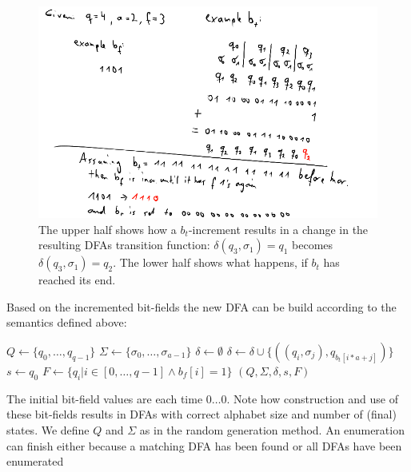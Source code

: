 
\begin{figure}
	\includegraphics[width=\linewidth]{images/dfa_enum_incr.png}
	\caption{The upper half shows how a $b_t$-increment results in a change in the resulting DFAs transition function: $\delta(q_3, \sigma_1) = q_1$ becomes $\delta(q_3, \sigma_1) = q_2$. The lower half shows what happens, if $b_t$ has reached its end.}
	\label{fig:dfa_enum_incr}
\end{figure}

Based on the incremented bit-fields the new DFA can be build according to the semantics defined above:
\vspace{0.2cm}
\begin{algorithmic}[1]
	\State $Q \gets \{q_0, \ldots, q_{q-1}\}$
	\State $\Sigma \gets \{\sigma_0, \ldots, \sigma_{a-1}\}$
	\State $\delta \gets \emptyset$
			\State $\delta \gets \delta \cup \{((q_i, \sigma_j), q_{b_t[i * a + j]})\}$
		\EndFor
	\EndFor
	\State $s \gets q_0$
	\State $F \gets \{ q_i | i \in [0, \ldots, q-1] \land b_f[i] = 1 \}$
	\State \Return $(Q, \Sigma, \delta, s, F)$
	\EndFunction
\end{algorithmic}
\vspace{0.2cm}
The initial bit-field values are each time $0\ldots 0$. Note how construction and use of these bit-fields results in DFAs with correct alphabet size and number of (final) states. We define $Q$ and $\Sigma$ as in the random generation method. An enumeration can finish either because a matching DFA has been found or all DFAs have been enumerated 

